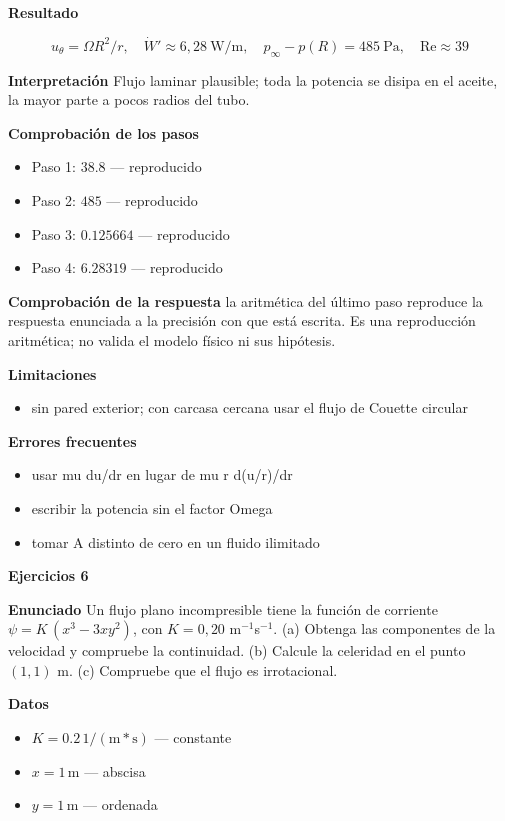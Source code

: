 \documentclass[10pt,openany]{book}
\begin{document}
\noindent\textbf{Resultado}

\[
u_\theta = \Omega R^{2}/r,\quad \dot W' \approx 6{,}28\ \mathrm{W/m},\quad p_\infty - p(R) = 485\ \mathrm{Pa},\quad \mathrm{Re} \approx 39
\]

\noindent\textbf{Interpretación}
Flujo laminar plausible; toda la potencia se disipa en el aceite, la mayor parte a pocos radios del tubo.

\noindent\textbf{Comprobación de los pasos}
\begin{itemize}
\item Paso 1: $38.8$ — reproducido
\item Paso 2: $485$ — reproducido
\item Paso 3: $0.125664$ — reproducido
\item Paso 4: $6.28319$ — reproducido
\end{itemize}

\noindent\textbf{Comprobación de la respuesta} la aritmética del último paso reproduce la respuesta enunciada a la precisión con que está escrita. Es una reproducción aritmética; no valida el modelo físico ni sus hipótesis.

\noindent\textbf{Limitaciones}
\begin{itemize}
\item sin pared exterior; con carcasa cercana usar el flujo de Couette circular
\end{itemize}

\noindent\textbf{Errores frecuentes}
\begin{itemize}
\item usar mu du/dr en lugar de mu r d(u/r)/dr
\item escribir la potencia sin el factor Omega
\item tomar A distinto de cero en un fluido ilimitado
\end{itemize}

\noindent\textbf{Ejercicios 6}

\noindent\textbf{Enunciado}
Un flujo plano incompresible tiene la función de corriente \(\psi = K\,(x^{3} - 3xy^{2})\), con \(K = 0{,}20\) m\(^{-1}\)s\(^{-1}\). (a) Obtenga las componentes de la velocidad y compruebe la continuidad. (b) Calcule la celeridad en el punto \((1, 1)\) m. (c) Compruebe que el flujo es irrotacional.

\noindent\textbf{Datos}
\begin{itemize}
\item $K = 0.2\,\mathrm{1/(m*s)}$ — constante
\item $x = 1\,\mathrm{m}$ — abscisa
\item $y = 1\,\mathrm{m}$ — ordenada
\end{itemize}
\end{document}
